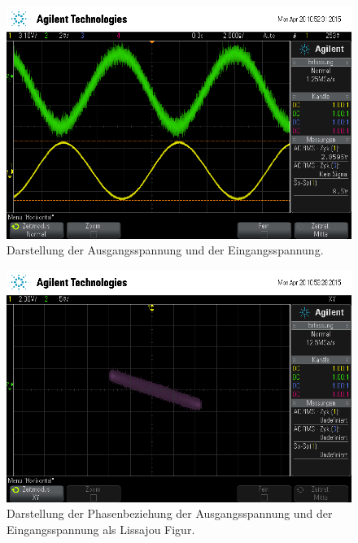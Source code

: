 \begin{figure}[!h]
    \centering
    \includegraphics[width=0.8\linewidth]{data/scope_2.png}
    \caption{Darstellung der Ausgangsspannung und der Eingangsspannung.}
    \label{fig:phase_verlauf}
\end{figure}

\begin{figure}[!h]
    \centering
    \includegraphics[width=0.8\linewidth]{data/scope_3.png}
    \caption{Darstellung der Phasenbeziehung der Ausgangsspannung und der Eingangsspannung als Lissajou Figur.}
    \label{fig:phase_liss}
\end{figure}

\FloatBarrier